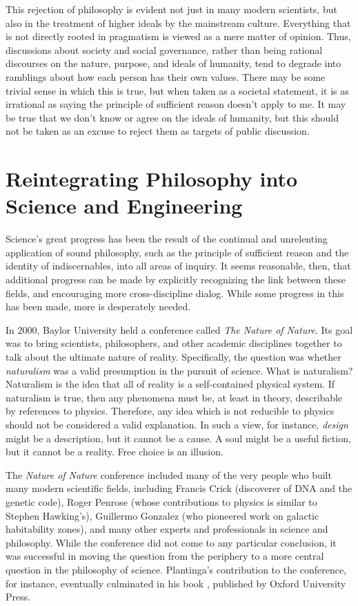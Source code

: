 This rejection of philosophy is evident not just in many modern scientists, but also in the treatment of higher ideals by the mainstream culture.  Everything that is not directly rooted in pragmatism is viewed as a mere matter of opinion.  Thus, discussions about society and social governance, rather than being rational discourses on the nature, purpose, and ideals of humanity, tend to degrade into ramblings about how each person has their own values.  There may be some trivial sense in which this is true, but when taken as a societal statement, it is as irrational as saying the principle of sufficient reason doesn't apply to me.  It may be true that we don't know or agree on the ideals of humanity, but this should not be taken as an excuse to reject them as targets of public discussion.

\section{Reintegrating Philosophy into Science and Engineering}

Science's great progress has been the result of the continual and unrelenting application of sound philosophy, such as the principle of sufficient reason and the identity of indiscernables, into all areas of inquiry.  It seems reasonable, then, that additional progress can be made by explicitly recognizing the link between these fields, and encouraging more cross-discipline dialog.  While some progress in this has been made, more is desperately needed.

In 2000, Baylor University held a conference called \textit{The Nature of Nature}.  Its goal was to bring scientists, philosophers, and other academic disciplines together to talk about the ultimate nature of reality.  Specifically, the question was whether \textit{naturalism} was a valid presumption in the pursuit of science.\citep{gordondembski2011}  What is naturalism?  Naturalism is the idea that all of reality is a self-contained physical system.  If naturalism is true, then any phenomena must be, at least in theory, describable by references to physics.  Therefore, any idea which is not reducible to physics should not be considered a valid explanation.  In such a view, for instance, \textit{design} might be a description, but it cannot be a cause.  A soul might be a useful fiction, but it cannot be a reality.  Free choice is an illusion.  

The \textit{Nature of Nature} conference included many of the very people who built many modern scientific fields, including Francis Crick (discoverer of DNA and the genetic code), Roger Penrose (whose contributions to physics is similar to Stephen Hawking's), Guillermo Gonzalez (who pioneered work on galactic habitability zones), and many other experts and professionals in science and philosophy.  While the conference did not come to any particular conclusion, it was successful in moving the question from the periphery to a more central question in the philosophy of science.  Plantinga's contribution to the conference, for instance, eventually culminated in his book , published by Oxford University Press.\citep{plantinga2011}\citep{plantinga2011b}

